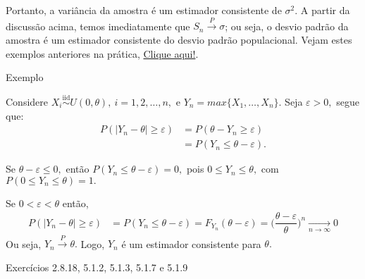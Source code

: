 \documentclass[12pt]{beamer}
\begin{document}
\begin{frame}{}
\begin{block}{}
\justifying
Portanto, a variância da amostra é um estimador consistente de $\sigma^2$. A partir da discussão acima, temos imediatamente que $S_{n} \xrightarrow{P} \sigma$; ou seja, o desvio padrão da amostra é um estimador consistente do desvio padrão populacional. Vejam estes exemplos anteriores na prática, \href{https://est711.shinyapps.io/ConvergenciaProbabilidade/}{Clique aqui!}.
\end{block}
\end{frame}

\begin{frame}{Exemplo}
\vspace{-0.3cm}
\begin{block}{}
\justifying
Considere $X_{i}\overset{\text{iid}}{\sim} U(0,\theta),~i=1,2,\ldots,n,$ e $Y_{n}=max\{X_{1}, \ldots, X_{n}\}.$ Seja $\varepsilon>0,$ segue que:
\begin{align*}
    P(|Y_{n}-\theta|\geq \varepsilon)&=P(\theta-Y_{n}\geq \varepsilon)\\
    &=P(Y_{n}\leq \theta-\varepsilon).
\end{align*}
\end{block}
\pause
\begin{block}{}
\justifying
Se $\theta-\varepsilon\leq 0,$ então $P(Y_{n}\leq \theta-\varepsilon)=0,$ pois $0\leq Y_{n}\leq \theta,$ com $P(0\leq Y_{n}\leq \theta)=1.$
\end{block}
\pause
\begin{block}{}
\justifying
Se $0<\varepsilon<\theta$ então,
\begin{align*}
P(|Y_{n}-\theta|\geq \varepsilon)&=P(Y_{n}\leq \theta- \varepsilon)=F_{Y_{n}}(\theta-\varepsilon)=\Big(\dfrac{\theta-\varepsilon}{\theta}\Big)^{n}\xrightarrow[n\rightarrow\infty]{} 0
\end{align*}
Ou seja, $Y_{n} \xrightarrow{P} \theta.$ Logo, $Y_{n}$ é um estimador consistente para $\theta.$
\end{block}
\end{frame}

\begin{frame}{}
\begin{block}{\Home}
\justifying
Exercícios 2.8.18, 5.1.2, 5.1.3, 5.1.7 e 5.1.9
\end{block}
\end{frame}
\end{document}
